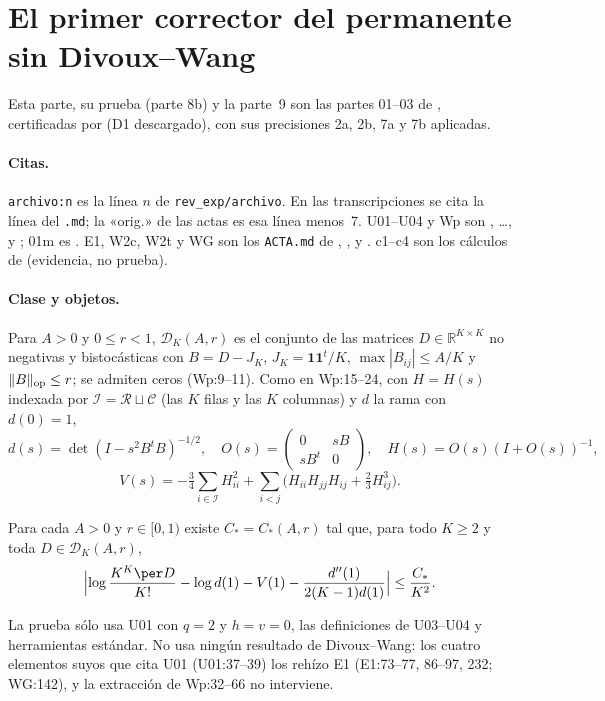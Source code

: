 \section{El primer corrector del permanente sin Divoux--Wang}
Esta parte, su prueba (parte 8b) y la parte~9 son las partes 01--03 de ,
certificadas por  (D1 descargado), con sus precisiones 2a, 2b, 7a y 7b aplicadas.
\paragraph{Citas.} \texttt{archivo:n} es la línea $n$ de \texttt{rev\_exp/archivo}. En las
transcripciones  se cita la línea del \texttt{.md}; la
«orig.» de las actas es esa línea menos~7. U01--U04 y Wp son
, \dots,  y
; 01m es .
E1, W2c, W2t y WG son los \texttt{ACTA.md} de , ,  y
. c1--c4 son los cálculos de  (evidencia, no prueba).

\paragraph{Clase y objetos.} Para $A>0$ y $0\le r<1$, $\mathcal D_K(A,r)$ es el conjunto de las
matrices $D\in\mathbb R^{K\times K}$ no negativas y bistocásticas con $B=D-J_K$,
$J_K=\mathbf1\mathbf1^t/K$, $\max|B_{ij}|\le A/K$ y $\|B\|_{\rm op}\le r$; se admiten ceros
(Wp:9--11). Como en Wp:15--24, con $H=H(s)$ indexada por $\mathcal I=\mathcal R\sqcup\mathcal C$
(las $K$ filas y las $K$ columnas) y $d$ la rama con $d(0)=1$,
\[
 d(s)=\det(I-s^2B^tB)^{-1/2},\quad O(s)=\begin{pmatrix}0&sB\\ sB^t&0\end{pmatrix},\quad
 H(s)=O(s)(I+O(s))^{-1},
\]
\[
 V(s)=-\tfrac34\sum_{i\in\mathcal I}H_{ii}^2+\sum_{i<j}\bigl(H_{ii}H_{jj}H_{ij}+\tfrac23H_{ij}^3\bigr).
\]
\begin{teorema}[W/permanente, Wp:25--29]\label{teo}
Para cada $A>0$ y $r\in[0,1)$ existe $C_*=C_*(A,r)$ tal que, para todo $K\ge2$ y toda
$D\in\mathcal D_K(A,r)$,
\[
 \Bigl|\log\frac{K^K\per D}{K!}-\log d(1)-V(1)-\frac{d''(1)}{2(K-1)d(1)}\Bigr|\le\frac{C_*}{K^2}.
\]
\end{teorema}
La prueba sólo usa U01 con $q=2$ y $h=v=0$, las definiciones de U03--U04 y herramientas
estándar. No usa ningún resultado de Divoux--Wang: los cuatro elementos suyos que cita U01
(U01:37--39) los rehízo E1 (E1:73--77, 86--97, 232; WG:142), y la extracción de Wp:32--66
no interviene.

